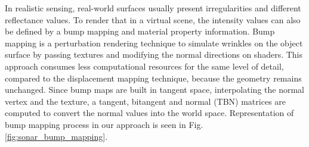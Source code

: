 \documentclass[final,5p,times]{elsarticle}
\begin{document}
In realistic sensing, real-world surfaces usually present irregularities and different reflectance values. To render that in a virtual scene, the intensity values can also be defined by a bump mapping and material property information. Bump mapping is a perturbation rendering technique to simulate wrinkles on the object surface by passing textures and modifying the normal directions on shaders. This approach consumes less computational resources for the same level of detail, compared to the displacement mapping technique, because the geometry remains unchanged. Since bump maps are built in tangent space, interpolating the normal vertex and the texture, a tangent, bitangent and normal (TBN) matrices are computed to convert the normal values into the world space. Representation of bump mapping process in our approach is seen in Fig. \ref{fig:sonar_bump_mapping}.
\end{document}
